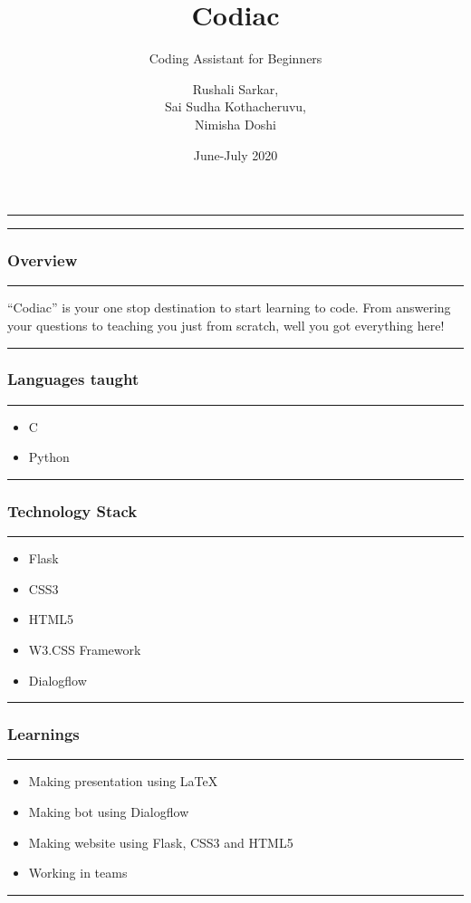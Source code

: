 \documentclass[14pt]{beamer}
\title[Codiac]{Codiac}
\subtitle[Coding Assitant]{Coding Assistant for Beginners}
\author[Team 2]{Rushali Sarkar, \\ Sai Sudha Kothacheruvu, \\ Nimisha Doshi}
\date[June 2020]{June-July 2020}
\begin{document}
\begin{frame}
    \noindent
    {\color{blue} \rule{\linewidth}{0.7mm} }
    \titlepage
    \noindent
    {\color{blue} \rule{\linewidth}{0.7mm} }
\end{frame}

\begin{frame}
    \frametitle{Overview}
    \noindent
    {\color{blue} \rule{\linewidth}{0.7mm} }
    ``Codiac'' is your one stop destination to start learning to code. From answering your questions to teaching you just from scratch, well you got everything here!
    \noindent
    {\color{blue} \rule{\linewidth}{0.7mm} }
\end{frame}

\begin{frame}
    \frametitle{Languages taught}
    \noindent
    {\color{blue} \rule{\linewidth}{0.7mm} }
    \begin{itemize}
    \item C
    \item Python
\end{itemize}   
\noindent
    {\color{blue} \rule{\linewidth}{0.7mm} }
\end{frame}


\begin{frame}
    \frametitle{Technology Stack}
    \noindent
    {\color{blue} \rule{\linewidth}{0.7mm} }
    \begin{itemize}
        \pause
    \item Flask \\
        \pause
    \item CSS3 \\
        \pause
    \item HTML5 \\
        \pause
    \item W3.CSS Framework \\
        \pause
    \item Dialogflow \\
\end{itemize}
\noindent
    {\color{blue} \rule{\linewidth}{0.7mm} }
\end{frame}

\begin{frame}
    \frametitle{Learnings}
    \noindent
    {\color{blue} \rule{\linewidth}{0.7mm} }
    \begin{itemize}
        \pause
    \item Making presentation using LaTeX \\
        \pause
    \item Making bot using Dialogflow \\
        \pause
    \item Making website using Flask, CSS3 and HTML5 \\
        \pause
    \item Working in teams\\
\end{itemize}
\noindent
    {\color{blue} \rule{\linewidth}{0.7mm} }
\end{frame}
\end{document}
